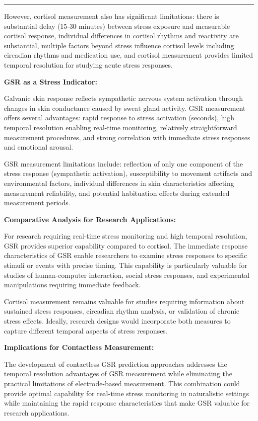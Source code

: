 \documentclass[12pt,a4paper]{report}
\begin{document}
\hrule

However, cortisol measurement also has significant limitations: there is substantial delay (15-30 minutes) between
stress exposure and measurable cortisol response, individual differences in cortisol rhythms and reactivity are
substantial, multiple factors beyond stress influence cortisol levels including circadian rhythms and medication use,
and cortisol measurement provides limited temporal resolution for studying acute stress responses.

\textbf{GSR as a Stress Indicator:}

Galvanic skin response reflects sympathetic nervous system activation through changes in skin conductance caused by
sweat gland activity. GSR measurement offers several advantages: rapid response to stress activation (seconds), high
temporal resolution enabling real-time monitoring, relatively straightforward measurement procedures, and strong
correlation with immediate stress responses and emotional arousal.

GSR measurement limitations include: reflection of only one component of the stress response (sympathetic activation),
susceptibility to movement artifacts and environmental factors, individual differences in skin characteristics affecting
measurement reliability, and potential habituation effects during extended measurement periods.

\textbf{Comparative Analysis for Research Applications:}

For research requiring real-time stress monitoring and high temporal resolution, GSR provides superior capability
compared to cortisol. The immediate response characteristics of GSR enable researchers to examine stress responses to
specific stimuli or events with precise timing. This capability is particularly valuable for studies of human-computer
interaction, social stress responses, and experimental manipulations requiring immediate feedback.

Cortisol measurement remains valuable for studies requiring information about sustained stress responses, circadian
rhythm analysis, or validation of chronic stress effects. Ideally, research designs would incorporate both measures to
capture different temporal aspects of stress responses.

\textbf{Implications for Contactless Measurement:}

The development of contactless GSR prediction approaches addresses the temporal resolution advantages of GSR measurement
while eliminating the practical limitations of electrode-based measurement. This combination could provide optimal
capability for real-time stress monitoring in naturalistic settings while maintaining the rapid response characteristics
that make GSR valuable for research applications.
\end{document}
